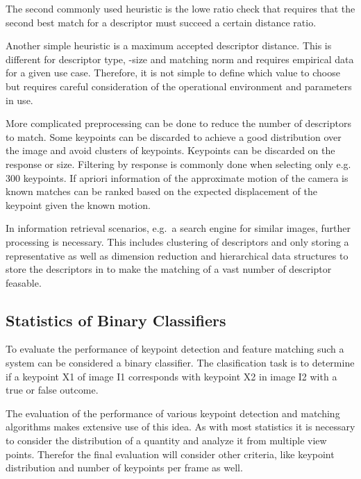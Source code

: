 The second commonly used heuristic is the lowe ratio check\cite{lowe_ijcv2004} that requires that the second best match for a descriptor must succeed a certain distance ratio.

Another simple heuristic is a maximum accepted descriptor distance.
This is different for descriptor type, -size and matching norm and requires empirical data for a given use case.
Therefore, it is not simple to define which value to choose but requires careful consideration of the operational environment and parameters in use.

More complicated preprocessing can be done to reduce the number of descriptors to match.
Some keypoints can be discarded to achieve a good distribution over the image and avoid clusters of keypoints.
Keypoints can be discarded on the response or size.
Filtering by response is commonly done when selecting only e.g. 300 keypoints.
If apriori information of the approximate motion of the camera is known matches can be ranked based on the expected displacement of the keypoint given the known motion.

In information retrieval scenarios, e.g.~a search engine for similar images, further processing is necessary.
This includes clustering of descriptors and only storing a representative as well as dimension reduction and hierarchical data structures to store the descriptors in to make the matching of a vast number of descriptor feasable.

\subsection{Statistics of Binary Classifiers}

To evaluate the performance of keypoint detection and feature matching such a system can be considered a binary classifier.
The clasification task is to determine if a keypoint X1 of image I1 corresponds with keypoint X2 in image I2 with a true or false outcome.

The evaluation of the performance of various keypoint detection and matching algorithms makes extensive use of this idea.
As with most statistics it is necessary to consider the distribution of a quantity and analyze it from multiple view points.
Therefor the final evaluation will consider other criteria, like keypoint distribution and number of keypoints per frame as well.

